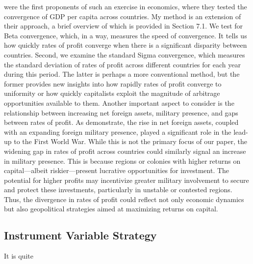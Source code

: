 \documentclass[10pt]{article}
\begin{document}
\par \citet{BarroSalaIMartin1997} were the first proponents of such an exercise in economics, where they tested the convergence of GDP per capita across countries. My method is an extension of their approach, a brief overview of which is provided in Section 7.1. We test for Beta convergence, which, in a way, measures the speed of convergence. It tells us how quickly rates of profit converge when there is a significant disparity between countries. Second, we examine the standard Sigma convergence, which measures the standard deviation of rates of profit across different countries for each year during this period. The latter is perhaps a more conventional method, but the former provides new insights into how rapidly rates of profit converge to uniformity or how quickly capitalists exploit the magnitude of arbitrage opportunities available to them. Another important aspect to consider is the relationship between increasing net foreign assets, military presence, and gaps between rates of profit. As \citet{hauner2017inequality} demonstrate, the rise in net foreign assets, coupled with an expanding foreign military presence, played a significant role in the lead-up to the First World War. While this is not the primary focus of our paper, the widening gap in rates of profit across countries could similarly signal an increase in military presence. This is because regions or colonies with higher returns on capital—albeit riskier—present lucrative opportunities for investment. The potential for higher profits may incentivize greater military involvement to secure and protect these investments, particularly in unstable or contested regions. Thus, the divergence in rates of profit could reflect not only economic dynamics but also geopolitical strategies aimed at maximizing returns on capital.
\subsection{Instrument Variable Strategy}
It is quite 
\end{document}
